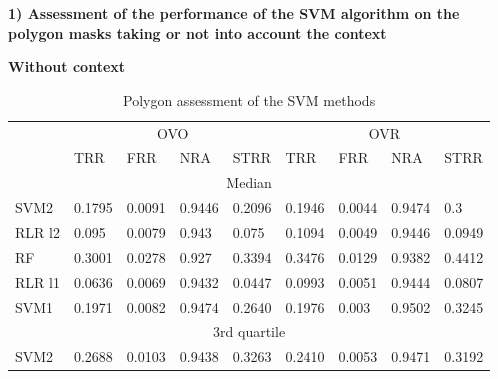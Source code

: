 \documentclass{siamart171218}
\begin{document}
\textbf{1) Assessment of the performance of the SVM algorithm on the polygon masks taking or not into account the context}

\textbf{Without context} 
\begin{table}[h!]
\centering
\caption{Polygon assessment of the SVM methods}
\begin{tabular}{lllllllll|}
\cline{2-9}
\multicolumn{1}{l|}{\multirow{2}{*}{}} & \multicolumn{4}{c|}{OVO} & \multicolumn{4}{c|}{OVR} \\ \cline{2-9} 
\multicolumn{1}{l|}{} & \multicolumn{1}{l|}{TRR} & \multicolumn{1}{l|}{FRR} & \multicolumn{1}{l|}{NRA} & \multicolumn{1}{l|}{STRR} & \multicolumn{1}{l|}{TRR} & \multicolumn{1}{l|}{FRR} & \multicolumn{1}{l|}{NRA} & STRR \\ \hline \hline
\multicolumn{9}{|c|}{Median} \\ \hline
\multicolumn{1}{|l|}{SVM2} & \multicolumn{1}{l|}{0.1795} & \multicolumn{1}{l|}{0.0091} & \multicolumn{1}{l|}{0.9446} & \multicolumn{1}{l|}{0.2096} & \multicolumn{1}{l|}{0.1946} & \multicolumn{1}{l|}{0.0044} & \multicolumn{1}{l|}{0.9474} & 0.3 \\ \hline
\multicolumn{1}{|l|}{RLR l2} & \multicolumn{1}{l|}{0.095} & \multicolumn{1}{l|}{0.0079} & \multicolumn{1}{l|}{0.943} & \multicolumn{1}{l|}{0.075} & \multicolumn{1}{l|}{0.1094} & \multicolumn{1}{l|}{0.0049} & \multicolumn{1}{l|}{0.9446} & 0.0949 \\ \hline
\multicolumn{1}{|l|}{RF} & \multicolumn{1}{l|}{0.3001} & \multicolumn{1}{l|}{0.0278} & \multicolumn{1}{l|}{0.927} & \multicolumn{1}{l|}{0.3394} & \multicolumn{1}{l|}{0.3476} & \multicolumn{1}{l|}{0.0129} & \multicolumn{1}{l|}{0.9382} & 0.4412 \\ \hline
\multicolumn{1}{|l|}{RLR l1} & \multicolumn{1}{l|}{0.0636} & \multicolumn{1}{l|}{0.0069} & \multicolumn{1}{l|}{0.9432} & \multicolumn{1}{l|}{0.0447} & \multicolumn{1}{l|}{0.0993} & \multicolumn{1}{l|}{0.0051} & \multicolumn{1}{l|}{0.9444} & 0.0807 \\ \hline
\multicolumn{1}{|l|}{SVM1} & \multicolumn{1}{l|}{0.1971} & \multicolumn{1}{l|}{0.0082} & \multicolumn{1}{l|}{0.9474} & \multicolumn{1}{l|}{0.2640} & \multicolumn{1}{l|}{0.1976} & \multicolumn{1}{l|}{0.003} & \multicolumn{1}{l|}{0.9502} & 0.3245 \\ \hline \hline 
\multicolumn{9}{|c|}{3rd   quartile} \\ \hline
\multicolumn{1}{|l|}{SVM2} & \multicolumn{1}{l|}{0.2688} & \multicolumn{1}{l|}{0.0103} & \multicolumn{1}{l|}{0.9438} & \multicolumn{1}{l|}{0.3263} & \multicolumn{1}{l|}{0.2410} & \multicolumn{1}{l|}{0.0053} & \multicolumn{1}{l|}{0.9471} & 0.3192 \\ \hline

\end{tabular}
\end{table}
\end{document}
